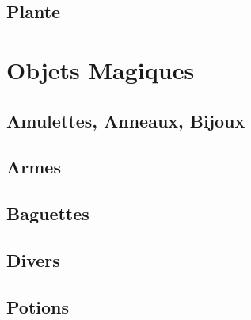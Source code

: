 \documentclass{dd}
\begin{document}
\section{Plante}


\chapter{Objets Magiques}

\section{Amulettes, Anneaux, Bijoux} \label{OMbijoux}




\section{Armes} \label{OMarmes}



\section{Baguettes} \label{OMbaguettes}


\section{Divers} \label{OMdivers}




\section{Potions} \label{potions}






 















 






\end{document}
